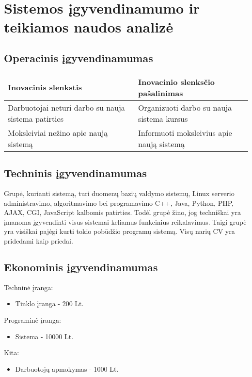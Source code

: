 \chapter{Sistemos \k{i}gyvendinamumo ir teikiamos naudos analiz\.{e}}

\section{Operacinis \k{i}gyvendinamumas}
\begin{tabular}{|p{5cm}|p{5cm}|}
\hline 
Inovacinis slenkstis & Inovacinio slenks\v{c}io pašalinimas\tabularnewline
\hline 
Darbuotojai neturi darbo su nauja sistema patirties & Organizuoti darbo su nauja sistema kursus\tabularnewline
\hline 
Moksleiviai nežino apie nauj\k{a} sistem\k{a} & Informuoti moksleivius apie nauj\k{a} sistem\k{a}\tabularnewline
\hline
\end{tabular}

\section{Techninis \k{i}gyvendinamumas}

Grupė, kurianti sistemą, turi duomenų bazių valdymo sistemų,
Linux serverio administravimo, algoritmavimo bei programavimo 
C++, Java, Python, PHP, AJAX, CGI, JavaScript kalbomis patirties.
Todėl grupė žino, jog techniškai yra įmanoma įgyvendinti visus sistemai 
keliamus funkcinius reikalavimus. Taigi
grup\.{e} yra visiškai paj\.{e}gi kurti tokio pob\={u}džio program\k{u}
sistem\k{a}. Vis\k{u} nari\k{u} CV yra pridedami kaip priedai. 

\section{Ekonominis \k{i}gyvendinamumas}

Technin\.{e} \k{i}ranga:
\begin{itemize}
  \item Tinklo \k{i}ranga - 200 Lt.
\end{itemize}

Programin\.{e} \k{i}ranga:
\begin{itemize}
  \item Sistema - 10000 Lt.
\end{itemize}

Kita:
\begin{itemize}
  \item Darbuotoj\k{u} apmokymas - 1000 Lt.
\end{itemize}

